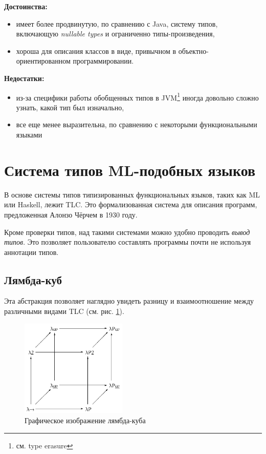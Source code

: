 \textbf{Достоинства:}
\begin{itemize}
    \item имеет более продвинутую, по сравнению с Java, систему типов, включающую \textit{nullable types} и ограниченно типы-произведения,
    \item хороша для описания классов в виде, привычном в объектно-ориентированном программировании.
\end{itemize}

\textbf{Недостатки:}
\begin{itemize}
    \item из-за специфики работы обобщенных типов в JVM\footnote{см. type erasure} иногда довольно сложно узнать, какой тип был изначально,
    \item все еще менее выразительна, по сравнению с некоторыми функциональными языками
\end{itemize}

\section{Система типов ML-подобных языков}
\label{sec:ml_type_system}

В основе системы типов типизированных функциональных языков, таких как ML или Haskell, лежит \gls{TLC}.
Это формализованная система для описания программ, предложенная Алонзо Чёрчем в 1930 году.

Кроме проверки типов, над такими системами можно удобно проводить \textit{вывод типов}.
Это позволяет пользователю составлять программы почти не используя аннотации типов.

\subsection{Лямбда-куб}
\label{subsec:lambda_cube}

Эта абстракция позволяет наглядно увидеть разницу и взаимоотношение между различными видами \gls{TLC} (см. рис. \ref{fig:lambda_cube}).

\begin{figure}[H]
    \centering
    \includegraphics[width=0.45\textwidth]{figures/Lambda_cube}
    \caption{Графическое изображение лямбда-куба}
    \label{fig:lambda_cube}
\end{figure}

